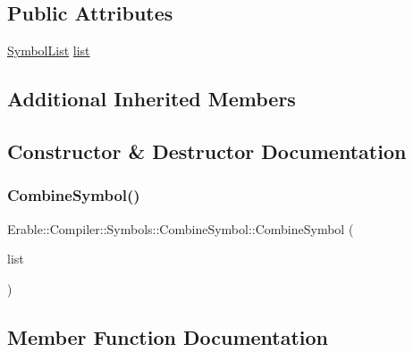 \subsection*{Public Attributes}
\begin{DoxyCompactItemize}
\item 
\mbox{\hyperlink{namespace_erable_1_1_compiler_1_1_symbols_a63e8157d2f729d4689d27bacad42f8ed}{Symbol\+List}} \mbox{\hyperlink{struct_erable_1_1_compiler_1_1_symbols_1_1_combine_symbol_a5bacd166436d523d163b11fb0d343b2e}{list}}
\end{DoxyCompactItemize}
\subsection*{Additional Inherited Members}


\subsection{Constructor \& Destructor Documentation}
\mbox{\label{struct_erable_1_1_compiler_1_1_symbols_1_1_combine_symbol_a8272aef11b5c378ba34f3ee54836a354}} 
\subsubsection{\texorpdfstring{CombineSymbol()}{CombineSymbol()}}
{\footnotesize\ttfamily Erable\+::\+Compiler\+::\+Symbols\+::\+Combine\+Symbol\+::\+Combine\+Symbol (\begin{DoxyParamCaption}\item[{\mbox{\hyperlink{namespace_erable_1_1_compiler_1_1_symbols_a63e8157d2f729d4689d27bacad42f8ed}{Symbol\+List}}}]{list }\end{DoxyParamCaption})}



\subsection{Member Function Documentation}
\mbox{\label{struct_erable_1_1_compiler_1_1_symbols_1_1_combine_symbol_ac20bc8743057e8668bb3871b24dd180d}} 
